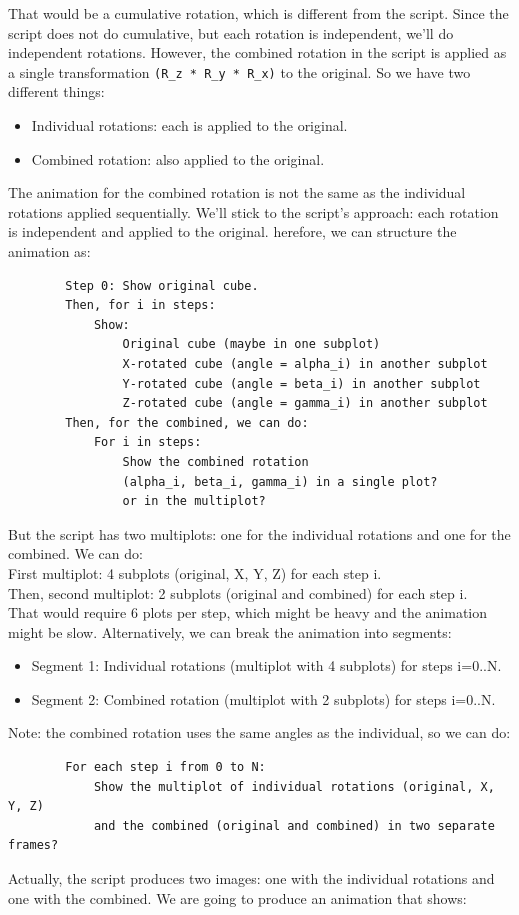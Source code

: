 \documentclass[a4paper,10pt]{article}
\begin{document}
That would be a cumulative rotation, which is different from the script.
Since the script does not do cumulative, but each rotation is independent, we'll do independent rotations.
However, the combined rotation in the script is applied as a single transformation \verb|(R_z * R_y * R_x)| to the original.
So we have two different things:
\begin{itemize}
\item Individual rotations: each is applied to the original.
\item Combined rotation: also applied to the original.
\end{itemize}
The animation for the combined rotation is not the same as the individual rotations applied sequentially.
We'll stick to the script's approach: each rotation is independent and applied to the original.
herefore, we can structure the animation as:\\
\begin{verbatim}
        Step 0: Show original cube.
        Then, for i in steps:
            Show:
                Original cube (maybe in one subplot)
                X-rotated cube (angle = alpha_i) in another subplot
                Y-rotated cube (angle = beta_i) in another subplot
                Z-rotated cube (angle = gamma_i) in another subplot
        Then, for the combined, we can do:
            For i in steps:
                Show the combined rotation
                (alpha_i, beta_i, gamma_i) in a single plot?
                or in the multiplot?
\end{verbatim}
But the script has two multiplots: one for the individual rotations and one for the combined.
We can do:\\
        First multiplot: 4 subplots (original, X, Y, Z) for each step i.\\
        Then, second multiplot: 2 subplots (original and combined) for each step i.\\
That would require 6 plots per step, which might be heavy and the animation might be slow.
Alternatively, we can break the animation into segments:
\begin{itemize}
\item Segment 1: Individual rotations (multiplot with 4 subplots) for steps i=0..N.
\item Segment 2: Combined rotation (multiplot with 2 subplots) for steps i=0..N.
\end{itemize}
Note: the combined rotation uses the same angles as the individual, so we can do:
\begin{verbatim}
        For each step i from 0 to N:
            Show the multiplot of individual rotations (original, X, Y, Z)
            and the combined (original and combined) in two separate frames?
\end{verbatim}
Actually, the script produces two images: one with the individual rotations and one with the combined.
We are going to produce an animation that shows:
\end{document}
